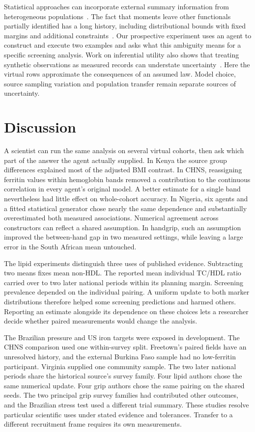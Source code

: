 \documentclass[sigconf,anonymous,review]{acmart}
\begin{document}
Statistical approaches can incorporate external summary information from heterogeneous populations~\cite{syndi}. The fact that moments leave other functionals partially identified has a long history, including distributional bounds with fixed margins and additional constraints~\cite{bounds,makarov,zaev}. Our prospective experiment uses an agent to construct and execute two examples and asks what this ambiguity means for a specific screening analysis. Work on inferential utility also shows that treating synthetic observations as measured records can understate uncertainty~\cite{inferential}. Here the virtual rows approximate the consequences of an assumed law. Model choice, source sampling variation and population transfer remain separate sources of uncertainty.

\section{Discussion}
A scientist can run the same analysis on several virtual cohorts, then ask which part of the answer the agent actually supplied. In Kenya the source group differences explained most of the adjusted BMI contrast. In CHNS, reassigning ferritin values within hemoglobin bands removed a contribution to the continuous correlation in every agent's original model. A better estimate for a single band nevertheless had little effect on whole-cohort accuracy. In Nigeria, six agents and a fitted statistical generator chose nearly the same dependence and substantially overestimated both measured associations. Numerical agreement across constructors can reflect a shared assumption. In handgrip, such an assumption improved the between-hand gap in two measured settings, while leaving a large error in the South African mean untouched.

The lipid experiments distinguish three uses of published evidence. Subtracting two means fixes mean non-HDL. The reported mean individual TC/HDL ratio carried over to two later national periods within its planning margin. Screening prevalence depended on the individual pairing. A uniform update to both marker distributions therefore helped some screening predictions and harmed others. Reporting an estimate alongside its dependence on these choices lets a researcher decide whether paired measurements would change the analysis.

The Brazilian pressure and US iron targets were exposed in development. The CHNS comparison used one within-survey split. Freetown's paired fields have an unresolved history, and the external Burkina Faso sample had no low-ferritin participant. Virginia supplied one community sample. The two later national periods share the historical source's survey family. Four lipid authors chose the same numerical update. Four grip authors chose the same pairing on the shared seeds. The two principal grip survey families had contributed other outcomes, and the Brazilian stress test used a different trial summary. These studies resolve particular scientific uses under stated evidence and tolerances. Transfer to a different recruitment frame requires its own measurements.



\appendix

\end{document}
